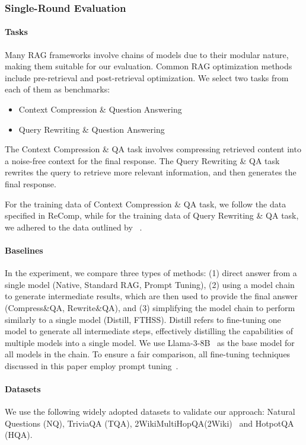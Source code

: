 \subsubsection{Single-Round Evaluation}
\paragraph{Tasks}
Many RAG frameworks involve chains of models due to their modular nature, 
making them suitable for our evaluation. Common RAG optimization methods include pre-retrieval and post-retrieval optimization. We select two tasks from each of them as benchmarks:
\begin{itemize}
\item Context Compression \& Question Answering
\item Query Rewriting \& Question Answering
\end{itemize}

The Context Compression \& QA task involves compressing retrieved content into a noise-free context for the final response. The Query Rewriting \& QA task rewrites the query to retrieve more relevant information, and then generates the final response.

For the training data of Context Compression \& QA task, we follow the data specified in ReComp\cite{xu2023recomp}, while for the training data of  Query Rewriting \& QA task, we adhered to the data outlined by ~\citet{ma2023query}.


\paragraph{Baselines}
In the experiment, we compare three types of methods: (1) direct answer from a single model (Native, Standard RAG, Prompt Tuning), (2) using a model chain to generate intermediate results, which are then used to provide the final answer (Compress\&QA, Rewrite\&QA), and (3) simplifying the model chain to perform similarly to a single model (Distill, FTHSS).
Distill refers to fine-tuning one model to generate all intermediate steps, effectively distilling the capabilities of multiple models into a single model. We use Llama-3-8B~\cite{dubey2024llama} as the base model for all models in the chain. To ensure a fair comparison, all fine-tuning techniques discussed in this paper employ prompt tuning~\cite{liu2021p}.



\paragraph{Datasets}
We use the following widely adopted datasets to validate our approach: Natural Questions (NQ)\cite{kwiatkowski2019natural}, TriviaQA (TQA)\cite{joshi2017triviaqa}, 2WikiMultiHopQA(2Wiki)~\cite{ho2020constructing} and HotpotQA (HQA)\cite{yang2018hotpotqa}. 

